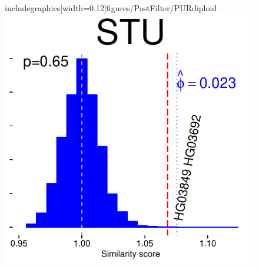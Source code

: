 \begin{figure}
includegraphics[width=0.12\paperwidth]{figures/PostFilter/PURdiploid}\includegraphics[width=0.12\paperwidth]{figures/PostFilter/STUdiploid}


\end{figure}
